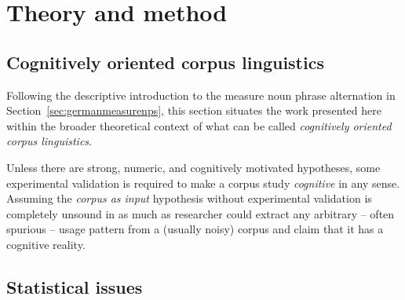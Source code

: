 \documentclass[USenglish]{article}
\begin{document}
\section{Theory and method}

\subsection{Cognitively oriented corpus linguistics}
\label{ssec:cocl}

Following the descriptive introduction to the measure noun phrase alternation in Section~\ref{sec:germanmeasurenps}, this section situates the work presented here within the broader theoretical context of what can be called \textit{cognitively oriented corpus linguistics}.

Unless there are strong, numeric, and cognitively motivated hypotheses, some experimental validation is required to make a corpus study \textit{cognitive} in any sense.
Assuming the \textit{corpus as input} hypothesis without experimental validation is completely unsound in as much as researcher could extract any arbitrary -- often spurious -- usage pattern from a (usually noisy) corpus and claim that it has a cognitive reality.






\subsection{Statistical issues}
\label{ssec:issuesstatistics}



\end{document}
